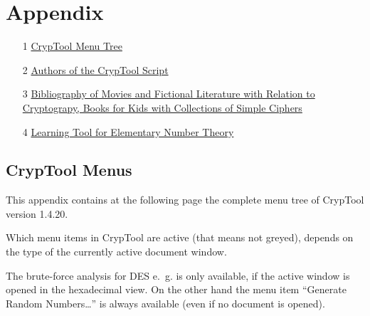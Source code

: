 
\newpage
\hypertarget{appendix-start}{}\label{s:appendix-start}

\chapter{Appendix}

    \begin{itemize}

      \item[1] \hyperlink{appendix-menutree}{CrypTool Menu Tree}

      \item[2] \hyperlink{appendix-authors}{Authors of the CrypTool Script}

      \item[3] \hyperlink{appendix-authors}{Bibliography of Movies and
                     Fictional Literature with Relation to Cryptograpy,
                     Books for Kids with Collections of Simple Ciphers}

      \item[4] \hyperlink{appendix-Learn-NT}
                     {Learning Tool for Elementary Number Theory}

    \end{itemize}




\newpage
\enlargethispage{1cm}
\hypertarget{appendix-menutree}{}
\section{CrypTool Menus}
\label{s:appendix-menutree}

This appendix contains at the following page the complete menu tree of
CrypTool version 1.4.20. 

Which menu items in CrypTool are active (that means not greyed), depends on
the type of the currently active document window.

The brute-force analysis for DES e.~g. is only
available, if the active window is opened in the hexadecimal view. 
On the other hand the menu item ``Generate Random Numbers\dots''
is always available (even if no document is opened).



